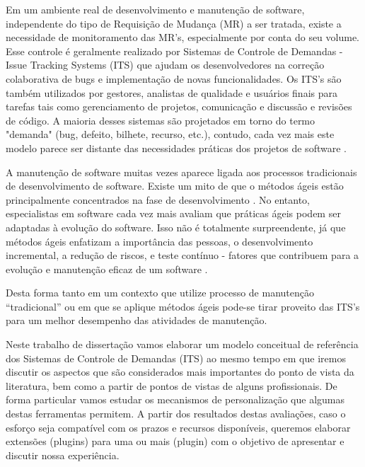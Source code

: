 \documentclass[msc,proposal,hidelot,hideabstract]{ppgccufmg} %
\begin{document}
Em  um ambiente real de desenvolvimento e manutenção de software, independente do tipo
de Requisição de Mudança (MR) a ser tratada, existe a necessidade de
monitoramento das MR's, especialmente por conta do seu volume. Esse controle é geralmente realizado
por Sistemas de Controle de Demandas - Issue Tracking Systems (ITS) que ajudam
os desenvolvedores na correção colaborativa de bugs e
implementação de novas funcionalidades.  Os ITS's são também utilizados por gestores, analistas de qualidade  e usuários finais para
tarefas tais como gerenciamento de projetos, comunicação e discussão e revisões
de código. A maioria desses sistemas são projetados em torno do termo "demanda"
(bug, defeito, bilhete, recurso, etc.), contudo, cada vez mais este modelo parece
ser distante das necessidades práticas dos projetos de software
\cite{Baysal:2013:SAP:2486788.2486957}.

A manutenção de software muitas vezes aparece ligada aos processos tradicionais
de desenvolvimento de software. Existe um mito de que o métodos ágeis estão
principalmente concentrados na fase de desenvolvimento
\cite{kajko2009model}. No entanto, especialistas em software cada vez mais
avaliam que práticas ágeis podem ser adaptadas à evolução do software. Isso não
é totalmente surpreendente, já que métodos ágeis enfatizam a importância das
pessoas, o desenvolvimento incremental, a redução de riscos, e teste contínuo -
fatores que contribuem para a evolução e manutenção  eficaz de um software
\cite{thomas2006agile}.

Desta forma tanto em um contexto que utilize processo de manutenção
``tradicional'' ou em que se aplique métodos ágeis pode-se tirar proveito das
ITS's para um melhor desempenho das atividades de manutenção.

Neste trabalho de dissertação vamos elaborar um modelo conceitual de referência
dos Sistemas de Controle de Demandas (ITS) ao mesmo tempo em que iremos discutir os aspectos que
são considerados mais importantes do ponto de vista da literatura, bem como a partir de pontos de vistas de alguns
profissionais. De forma particular vamos estudar os mecanismos de
personalização que algumas destas ferramentas permitem. A partir dos resultados destas avaliações, caso o esforço seja
compatível com os prazos e recursos disponíveis, queremos elaborar extensões (plugins)
para uma ou mais (plugin) com o objetivo de apresentar e
discutir nossa experiência.

\end{document}

